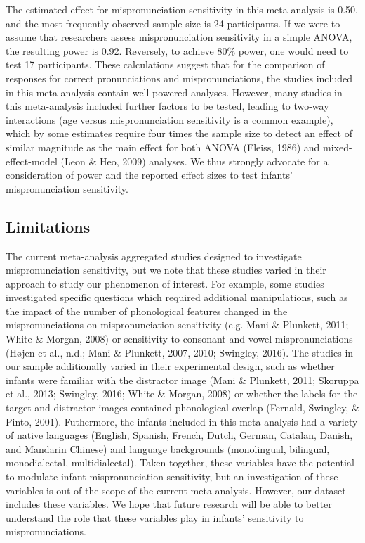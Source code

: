 \documentclass[man]{apa6}
\theoremstyle{definition}
\theoremstyle{definition}
\theoremstyle{definition}
\theoremstyle{remark}
\begin{document}
The estimated effect for mispronunciation sensitivity in this
meta-analysis is 0.50, and the most frequently observed sample size is
24 participants. If we were to assume that researchers assess
mispronunciation sensitivity in a simple ANOVA, the resulting power is
0.92. Reversely, to achieve 80\% power, one would need to test 17
participants. These calculations suggest that for the comparison of
responses for correct pronunciations and mispronunciations, the studies
included in this meta-analysis contain well-powered analyses. However,
many studies in this meta-analysis included further factors to be
tested, leading to two-way interactions (age versus mispronunciation
sensitivity is a common example), which by some estimates require four
times the sample size to detect an effect of similar magnitude as the
main effect for both ANOVA (Fleiss, 1986) and mixed-effect-model (Leon
\& Heo, 2009) analyses. We thus strongly advocate for a consideration of
power and the reported effect sizes to test infants' mispronunciation
sensitivity.

\subsection{Limitations}\label{limitations}

The current meta-analysis aggregated studies designed to investigate
mispronunciation sensitivity, but we note that these studies varied in
their approach to study our phenomenon of interest. For example, some
studies investigated specific questions which required additional
manipulations, such as the impact of the number of phonological features
changed in the mispronunciations on mispronunciation sensitivity (e.g.
Mani \& Plunkett, 2011; White \& Morgan, 2008) or sensitivity to
consonant and vowel mispronunciations (Højen et al., n.d.; Mani \&
Plunkett, 2007, 2010; Swingley, 2016). The studies in our sample
additionally varied in their experimental design, such as whether
infants were familiar with the distractor image (Mani \& Plunkett, 2011;
Skoruppa et al., 2013; Swingley, 2016; White \& Morgan, 2008) or whether
the labels for the target and distractor images contained phonological
overlap (Fernald, Swingley, \& Pinto, 2001). Futhermore, the infants
included in this meta-analysis had a variety of native languages
(English, Spanish, French, Dutch, German, Catalan, Danish, and Mandarin
Chinese) and language backgrounds (monolingual, bilingual,
monodialectal, multidialectal). Taken together, these variables have the
potential to modulate infant mispronunciation sensitivity, but an
investigation of these variables is out of the scope of the current
meta-analysis. However, our dataset includes these variables. We hope
that future research will be able to better understand the role that
these variables play in infants' sensitivity to mispronunciations.
\end{document}
